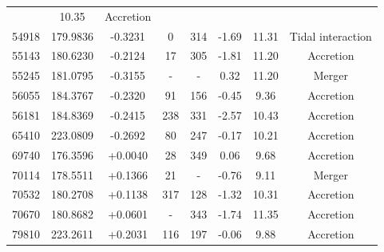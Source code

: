 \documentclass[fleqn,usenatbib]{mnras}
\begin{document}
\begin{table}
\begin{tabular*}{\linewidth}{cccccccc}
& 10.35%
& Accretion                   \\
54918                     & 179.9836              & -0.3231               & 0                             & 314                         & -1.69%
& 11.31%
& Tidal interaction                   \\
55143                     & 180.6230              & -0.2124               & 17                            & 305                         & -1.81%
& 11.20%
&   Accretion                 \\
55245                     & 181.0795             & -0.3155               & -                            & -                         & 0.32%
& 11.20%
&  Merger                  \\
56055                     & 184.3767              & -0.2320               & 91                            & 156                         & -0.45%
& 9.36%
& Accretion                   \\
56181                     & 184.8369              & -0.2415               & 238                           & 331                         & -2.57%
& 10.43%
& Accretion                    \\
65410                     & 223.0809               & -0.2692               & 80                            & 247                         & -0.17%
& 10.21%
& Accretion                    \\
69740                     & 176.3596              & +0.0040                & 28                            & 349                         & 0.06%
& 9.68%
& Accretion                    \\
70114                     & 178.5511              & +0.1366                & 21                            & -                          & -0.76%
& 9.11%
& Merger                   \\
70532                     & 180.2708               & +0.1138                & 317                           & 128                         & -1.32%
& 10.31%
& Accretion                   \\
70670                     & 180.8682               & +0.0601                & -                           & 343                         & -1.74%
& 11.35%
& Accretion                    \\
79810                     & 223.2611              & +0.2031                & 116                           & 197                         & -0.06%
& 9.88%
&  Accretion                   \\

\end{tabular*}
\end{table}
\end{document}
